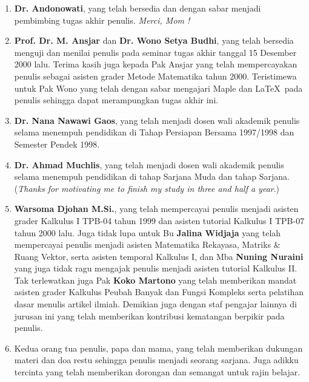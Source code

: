 \documentclass[12pt,a4paper]{report}
\begin{document}
\begin{enumerate}
\item[\textbf{1.}]  \textbf{Dr. Andonowati}, yang telah bersedia dan dengan
sabar menjadi pembimbing tugas akhir penulis. \textit{Merci, Mom
!}

\item[\textbf{2.}]  \textbf{Prof. Dr. M. Ansjar} dan \textbf{Dr. Wono Setya
Budhi}, yang telah bersedia menguji dan menilai penulis pada
seminar tugas akhir tanggal 15 Desember 2000 lalu. Terima kasih
juga kepada Pak Ansjar yang telah mempercayakan penulis sebagai
asisten grader Metode Matematika tahun 2000. Teristimewa untuk Pak
Wono yang telah dengan sabar mengajari Maple dan \LaTeX \ pada
penulis sehingga dapat merampungkan tugas akhir ini.

\item[\textbf{3.}]  \textbf{Dr. Nana Nawawi Gaos}, yang telah menjadi dosen
wali akademik penulis selama menempuh pendidikan di Tahap
Persiapan Bersama 1997/1998 dan Semester Pendek 1998.

\item[\textbf{4.}]  \textbf{Dr. Ahmad Muchlis}, yang telah menjadi dosen
wali akademik penulis selama menempuh pendidikan di tahap Sarjana
Muda dan tahap Sarjana. (\textit{Thanks for motivating me to
finish my study in \textsf{three and half a year}}.)

\item[\textbf{5.}]  \textbf{Warsoma Djohan M.Si.}, yang telah mempercayai
penulis menjadi asisten grader Kalkulus I TPB-04 tahun 1999 dan
asisten tutorial Kalkulus I TPB-07 tahun 2000 lalu. Juga tidak lupa untuk Bu \textbf{%
Jalina Widjaja} yang telah mempercayai penulis menjadi asisten
Matematika Rekayasa, Matriks \& Ruang Vektor, serta asisten
temporal Kalkulus I, dan Mba \textbf{Nuning Nuraini} yang juga
tidak ragu mengajak penulis menjadi asisten tutorial Kalkulus II.
Tak terlewatkan juga Pak \textbf{Koko Martono} yang telah
memberikan mandat asisten grader Kalkulus Peubah Banyak dan Fungsi
Kompleks serta pelatihan dasar menulis artikel ilmiah. Demikian
juga dengan staf pengajar lainnya di jurusan ini yang telah
memberikan kontribusi kematangan berpikir pada penulis.

\item[\textbf{6.}]  Kedua orang tua penulis, papa dan mama, yang telah
memberikan dukungan materi dan doa restu sehingga penulis menjadi
seorang sarjana. Juga adikku tercinta yang telah memberikan
dorongan dan semangat untuk rajin belajar. \setcounter{page}{7}


\end{enumerate}
\end{document}
